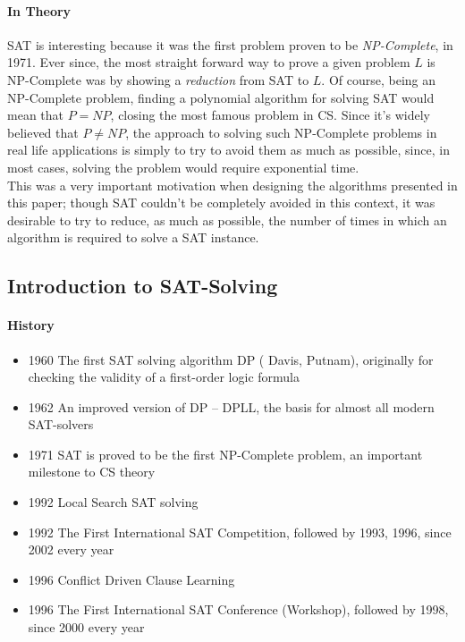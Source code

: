 \documentclass[]{article}
\begin{document}
	\paragraph{In Theory} SAT is interesting because it was the first problem proven to be \textit{NP-Complete}, in 1971. Ever since, the most straight forward way to prove a given problem $ L $ is NP-Complete was by showing a \textit{reduction} from SAT to $ L $. Of course, being an NP-Complete problem, finding a polynomial algorithm for solving SAT would mean that $ P=NP $, closing the most famous problem in CS. Since it's widely believed that $ P \neq NP $, the approach to solving such NP-Complete problems in real life applications is simply to try to avoid them as much as possible, since, in most cases, solving the problem would require exponential time. \\
	This was a very important motivation when designing the algorithms presented in this paper; though SAT couldn't be completely avoided in this context, it was desirable to try to reduce, as much as possible, the number of times in which an algorithm is required to solve a SAT instance.
	\pagebreak
	\subsection{Introduction to SAT-Solving}
	\paragraph{History}
	\begin{itemize}
		\item 1960 The first SAT solving algorithm DP ( Davis, Putnam), originally for checking the validity of a first-order logic formula
		\item 1962 An improved version of DP – DPLL, the basis for almost all modern SAT-solvers
		\item 1971 SAT is proved to be the first NP-Complete problem, an important milestone to CS theory
		\item 1992 Local Search SAT solving
		\item 1992 The First International SAT Competition, followed by 1993, 1996, since 2002 every year
		\item 1996 Conflict Driven Clause Learning
		\item 1996 The First International SAT Conference (Workshop), followed by 1998, since 2000 every year
	\end{itemize}
	
\end{document}

